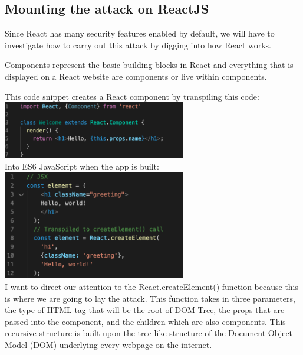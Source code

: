 \documentclass[conference]{IEEEtran}
\begin{document}
\subsection{Mounting the attack on ReactJS}

Since React has many security features enabled by default, we will have to investigate how to carry out this attack by digging into how React works.

Components represent the basic building blocks in React and everything that is displayed on a React website are components or live within components.

This code snippet creates a React component by transpiling this code:\\

\includegraphics[width = 8cm]{reactComponent.png}\\

Into ES6 JavaScript when the app is built:\\

\includegraphics[width = 8cm]{jsx.png}\\

I want to direct our attention to the React.createElement() function because this is where we are going to lay the attack. This function takes in three parameters, the type of HTML tag that will be the root of DOM Tree, the props that are passed into the component, and the children which are also components. This recursive structure is built upon the tree like structure of the Document Object Model (DOM) underlying every webpage on the internet.\\
\end{document}
